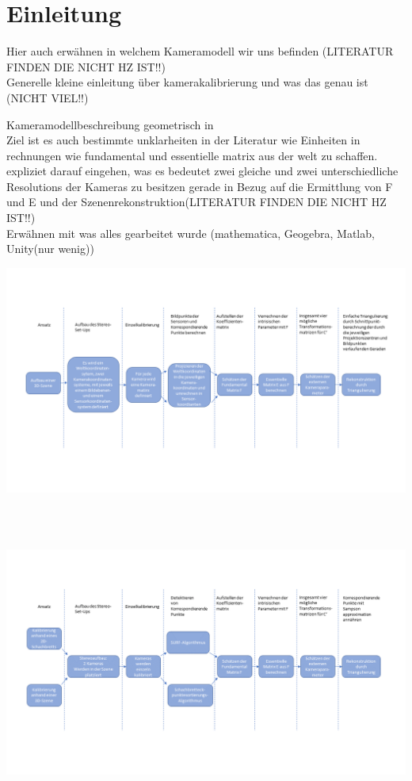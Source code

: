 \chapter{Einleitung}
\label{sec:einleitung} 

Hier auch erwähnen in welchem Kameramodell wir uns befinden (LITERATUR FINDEN DIE NICHT HZ IST!!)\\
Generelle kleine einleitung über kamerakalibrierung und was das genau ist (NICHT VIEL!!)

Kameramodellbeschreibung geometrisch in \cite{Jianzhong}\\

Ziel ist es auch bestimmte unklarheiten in der Literatur wie Einheiten in rechnungen wie fundamental und essentielle matrix aus der welt zu schaffen.\\

expliziet darauf eingehen, was es bedeutet zwei gleiche und zwei unterschiedliche Resolutions der Kameras zu besitzen gerade in Bezug auf die Ermittlung von F und E und der Szenenrekonstruktion(LITERATUR FINDEN DIE NICHT HZ IST!!)\\

Erwähnen mit was alles gearbeitet wurde (mathematica, Geogebra, Matlab, Unity(nur wenig))


	\begin{minipage}{\linewidth}
	\centering
	\includegraphics[width=1.\linewidth]{images/ArbeitsProzessMinimal.png}
\end{minipage}\\ \\


	\begin{minipage}{\linewidth}
	\centering
	\includegraphics[width=1.\linewidth]{images/ArbeitsProzessReal.png}
\end{minipage}\\ \\

